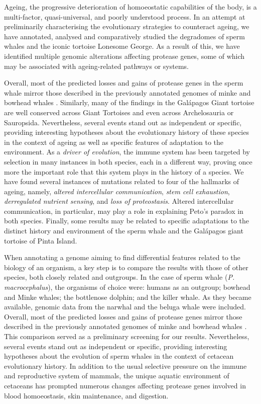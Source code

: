 Ageing, the progressive deterioration of homoeostatic capabilities of the body, is a multi-factor, quasi-universal, and poorly understood process.
In an attempt at preliminarily characterising the evolutionary strategies to counteract ageing, we have annotated, analysed and comparatively studied the degradomes of sperm whales and the iconic tortoise Lonesome George.
As a result of this, we have identified multiple genomic alterations affecting protease genes, some of which may be associated with ageing-related pathways or systems.

Overall, most of the predicted losses and gains of protease genes in the sperm whale mirror those described in the previously annotated genomes of minke \cite{Yim2014c} and bowhead whales \cite{Keane2015}.
Similarly, many of the findings in the Gal\'{a}pagos Giant tortoise are well conserved across Giant Tortoises and even across Archelosauria or Sauropsida.
Nevertheless, several events stand out as independent or specific, providing interesting hypotheses about the evolutionary history of these species in the context of ageing as well as specific features of adaptation to the environment.
As a \textit{driver of evolution}, the immune system has been targeted by selection in many instances in both species, each in a different way, proving once more the important role that this system plays in the history of a species. 
We have found several instances of mutations related to four of the hallmarks of ageing, namely, \textit{altered intercellular communication}, \textit{stem cell exhaustion}, \textit{derregulated nutrient sensing}, and \textit{loss of proteostasis}.
Altered intercellular communication, in particular, may play a role in explaining Peto's paradox in both species.
Finally, some results may be related to specific adaptations to the distinct history and environment of the sperm whale and the Gal\'{a}pagos giant tortoise of Pinta Island.

When annotating a genome aiming to find differential features related to the biology of an organism, a key step is to compare the results with those of other species, both closely related and outgroups.
In the case of sperm whale (\textit{P. macrocephalus}), the organisms of choice were: humans as an outgroup; bowhead and Minke whales; the bottlenose dolphin; and the killer whale.
As they became available, genomic data from the narwhal and the beluga whale were included.
Overall, most of the predicted losses and gains of protease genes mirror those described in the previously annotated genomes of minke \cite{Yim2014c} and bowhead whales \cite{Keane2015}.
This comparison served as a preliminary screening for our results.
Nevertheless, several events stand out as independent or specific, providing interesting hypotheses about the evolution of sperm whales in the context of cetacean evolutionary history.
In addition to the usual selective pressure on the immune and reproductive system of mammals, the unique aquatic environment of cetaceans has prompted numerous changes affecting protease genes involved in blood homoeostasis, skin maintenance, and digestion.


